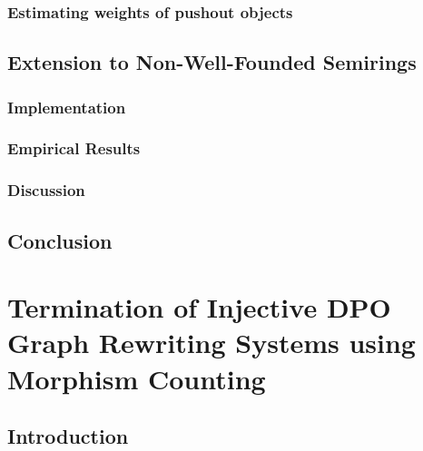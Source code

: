 \documentclass{report}
\begin{document}
\subsection{Estimating weights of pushout objects} 
\label{sec:type_graph:wf:weighing_pushout} 
   

     
  
\section{Extension to Non-Well-Founded Semirings}

 

\subsection{Implementation}
\label{nwf:sec:type_graph:implementation}
 

\subsection{Empirical Results}
\label{nwf:sec:type_graph:result}
 

\subsection{Discussion}
\label{nwf:sec:type_graph:related_work}


\section{Conclusion}
\label{nwf:sec:type_graph:conclusion}


\chapter{Termination of Injective DPO Graph Rewriting
Systems using Morphism Counting}
\label{chap:subgraph_counting}

\section{Introduction}
\label{subgraph_counting:sec:intro}

\end{document}
